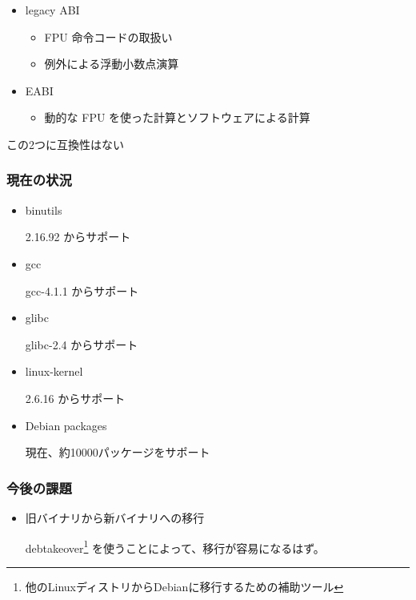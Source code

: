 \documentclass[cjk,dvipdfmx,12pt]{beamer}
\begin{document}
\begin{frame} 
\begin{itemize}
  \item legacy ABI
    \begin{itemize}
     
	\item FPU 命令コードの取扱い
	\item 例外による浮動小数点演算
    \end{itemize}

  \item EABI
    \begin{itemize}
	\item 動的な FPU を使った計算とソフトウェアによる計算
    \end{itemize}
\end{itemize}
  この2つに互換性はない
\end{frame}


\begin{frame}
\frametitle{現在の状況} 
\begin{itemize}
  \item binutils

	2.16.92 からサポート
  \item gcc
	
	gcc-4.1.1 からサポート
  \item glibc
	
	glibc-2.4 からサポート
  \item linux-kernel

	2.6.16 からサポート
  \item Debian packages

	現在、約10000パッケージをサポート
\end{itemize}
\end{frame}


\begin{frame}
\frametitle{今後の課題} 
\begin{itemize}
  \item 旧バイナリから新バイナリへの移行

	debtakeover\footnote{他のLinuxディストリからDebianに移行するための補助ツール} 
	を使うことによって、移行が容易になるはず。
 

\end{itemize}
\end{frame}
\end{document}
